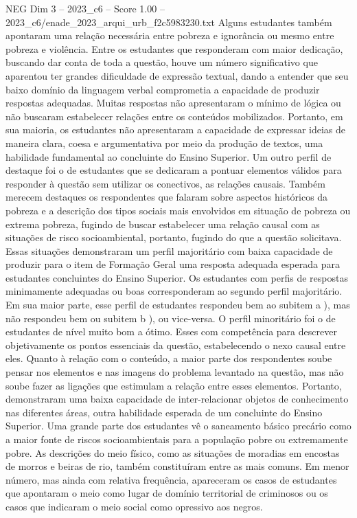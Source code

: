 \begin{textsample}{NEG Dim 3 – 2023\_c6 – Score 1.00 – 2023\_c6/enade\_2023\_arqui\_urb\_f2c5983230.txt}
Alguns estudantes também apontaram uma relação necessária entre pobreza e ignorância ou mesmo entre pobreza e violência.
Entre os estudantes que responderam com maior dedicação, buscando dar conta de toda a questão, houve um número significativo que aparentou ter grandes dificuldade de expressão textual, dando a entender que seu baixo domínio da linguagem verbal comprometia a capacidade de produzir respostas adequadas.
Muitas respostas não apresentaram o mínimo de lógica ou não buscaram estabelecer relações entre os conteúdos mobilizados.
Portanto, em sua maioria, os estudantes não apresentaram a capacidade de expressar ideias de maneira clara, coesa e argumentativa por meio da produção de textos, uma habilidade fundamental ao concluinte do Ensino Superior.
Um outro perfil de destaque foi o de estudantes que se dedicaram a pontuar elementos válidos para responder à questão sem utilizar os conectivos, as relações causais.
Também merecem destaques os respondentes que falaram sobre aspectos históricos da pobreza e a descrição dos tipos sociais mais envolvidos em situação de pobreza ou extrema pobreza, fugindo de buscar estabelecer uma relação causal com as situações de risco socioambiental, portanto, fugindo do que a questão solicitava.
Essas situações demonstraram um perfil majoritário com baixa capacidade de produzir para o item de Formação Geral uma resposta adequada esperada para estudantes concluintes do Ensino Superior.
Os estudantes com perfis de respostas minimamente adequadas ou boas corresponderam ao segundo perfil majoritário.
Em sua maior parte, esse perfil de estudantes respondeu bem ao subitem a ), mas não respondeu bem ou subitem b ), ou vice-versa.
O perfil minoritário foi o de estudantes de nível muito bom a ótimo.
Esses com competência para descrever objetivamente os pontos essenciais da questão, estabelecendo o nexo causal entre eles.
Quanto à relação com o conteúdo, a maior parte dos respondentes soube pensar nos elementos e nas imagens do problema levantado na questão, mas não soube fazer as ligações que estimulam a relação entre esses elementos.
Portanto, demonstraram uma baixa capacidade de inter-relacionar objetos de conhecimento nas diferentes áreas, outra habilidade esperada de um concluinte do Ensino Superior.
Uma grande parte dos estudantes vê o saneamento básico precário como a maior fonte de riscos socioambientais para a população pobre ou extremamente pobre.
As descrições do meio físico, como as situações de moradias em encostas de morros e beiras de rio, também constituíram entre as mais comuns.
Em menor número, mas ainda com relativa frequência, apareceram os casos de estudantes que apontaram o meio como lugar de domínio territorial de criminosos ou os casos que indicaram o meio social como opressivo aos negros.

\end{textsample}
